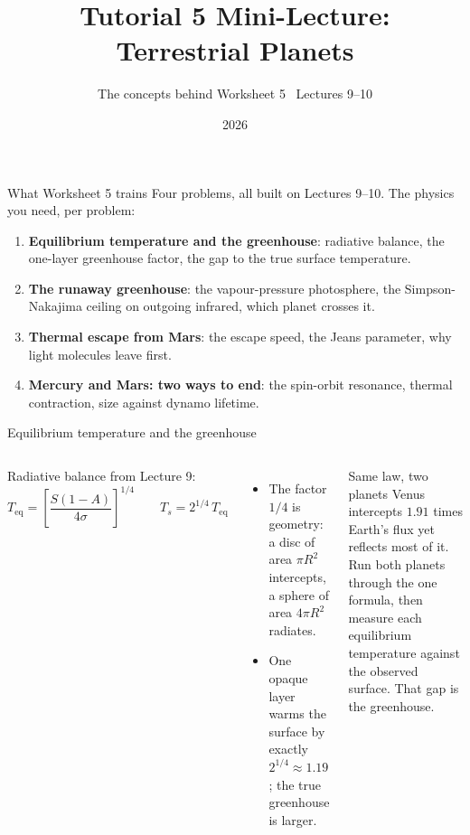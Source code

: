 \documentclass[aspectratio=169, 11pt]{beamer}
\title[T5 mini-lecture: Terrestrial Planets]{Tutorial 5 Mini-Lecture:\\Terrestrial Planets}
\subtitle{The concepts behind Worksheet 5 \textbullet\ Lectures 9--10}
\author{}
\institute{Kapteyn Astronomical Institute\\University of Groningen}
\date{2026}
\begin{document}
\begin{frame}
  \titlepage
\end{frame}

\begin{frame}{What Worksheet 5 trains}
  Four problems, all built on Lectures 9--10. The physics you need, per problem:
  \vskip4pt\relax
  \begin{enumerate}
    \item \textbf{Equilibrium temperature and the greenhouse}: radiative balance, the one-layer greenhouse factor, the gap to the true surface temperature.
    \item \textbf{The runaway greenhouse}: the vapour-pressure photosphere, the Simpson-Nakajima ceiling on outgoing infrared, which planet crosses it.
    \item \textbf{Thermal escape from Mars}: the escape speed, the Jeans parameter, why light molecules leave first.
    \item \textbf{Mercury and Mars: two ways to end}: the spin-orbit resonance, thermal contraction, size against dynamo lifetime.
  \end{enumerate}
  \vskip2pt\relax
\end{frame}

\begin{frame}{Equilibrium temperature and the greenhouse}
  \small
  \begin{columns}[T]
    Radiative balance from Lecture 9:
    \[
      \boxed{T_\mathrm{eq} = \left[\frac{S(1-A)}{4\sigma}\right]^{1/4}}
      \qquad T_s = 2^{1/4}\,T_\mathrm{eq}
    \]
    \begin{itemize}
      \item The factor $1/4$ is geometry: a disc of area $\pi R^2$ intercepts, a sphere of area $4\pi R^2$ radiates.
      \item One opaque layer warms the surface by exactly $2^{1/4} \approx 1.19$; the true greenhouse is larger.
    \end{itemize}

    \begin{block}{Same law, two planets}
      Venus intercepts $1.91$ times Earth's flux yet reflects most of it. Run both planets through the one formula, then measure each equilibrium temperature against the observed surface. That gap is the greenhouse.
    \end{block}
  \end{columns}
\end{frame}
\end{document}
